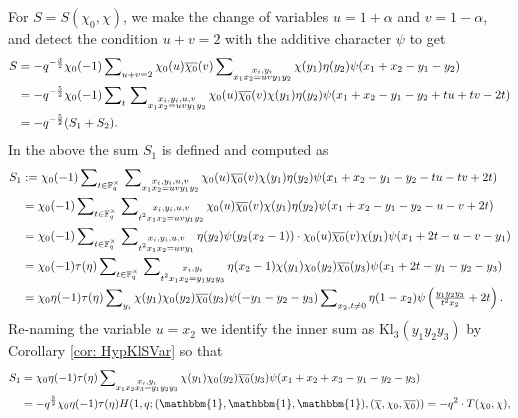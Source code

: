 \documentclass[A4]{amsart}
\numberwithin{equation}{section} \everymath{\displaystyle}
\newcommand{\id}{\mathbbm{1}}
\newcommand{\Kl}{\mathrm{Kl}}
\newcommand{\fF}{\mathbb{F}}
\begin{document}
	For $S=S(\chi_0,\chi)$, we make the change of variables $u=1+\alpha$ and $v = 1-\alpha$, and detect the condition $u+v = 2$ with the additive character $\psi$ to get
\begin{align*}
	S &= -q^{-\frac{3}{2}} \chi_0(-1)\sideset{}{_{u+v=2}} \sum \chi_0(u) \overline{\chi_0}(v) \sideset{}{_{\substack{x_i,y_i \\ x_1x_2 = uv y_1y_2}}} \sum \chi(y_1) \eta(y_2) \psi(x_1+x_2-y_1-y_2) \\
	&= -q^{-\frac{5}{2}} \chi_0(-1) \sideset{}{_t} \sum \sideset{}{_{\substack{x_i,y_i,u,v \\ x_1x_2 = uv y_1y_2}}} \sum \chi_0(u) \overline{\chi_0}(v) \chi(y_1) \eta(y_2) \psi(x_1+x_2-y_1-y_2+tu+tv-2t) \\
	&= -q^{-\frac{5}{2}}(S_1+S_2).
\end{align*}
	In the above the sum $S_1$ is defined and computed as
\begin{align*}
	S_1 &:= \chi_0(-1) \sideset{}{_{t \in \fF_q^{\times}}} \sum \sideset{}{_{\substack{x_i,y_i,u,v \\ x_1x_2 = uv y_1y_2}}} \sum \chi_0(u) \overline{\chi_0}(v) \chi(y_1) \eta(y_2) \psi(x_1+x_2-y_1-y_2-tu-tv+2t) \\
	&= \chi_0(-1) \sideset{}{_{t \in \fF_q^{\times}}} \sum \sideset{}{_{\substack{x_i,y_i,u,v \\ t^2 x_1x_2 = uv y_1y_2}}} \sum \chi_0(u) \overline{\chi_0}(v) \chi(y_1) \eta(y_2) \psi(x_1+x_2-y_1-y_2-u-v+2t) \\
	&= \chi_0(-1) \sideset{}{_{t \in \fF_q^{\times}}} \sum \sideset{}{_{\substack{x_i,y_i,u,v \\ t^2 x_1x_2 = uv y_1}}} \sum \eta(y_2) \psi(y_2(x_2-1)) \cdot \chi_0(u) \overline{\chi_0}(v) \chi(y_1) \psi(x_1+2t-u-v-y_1) \\
	&= \chi_0(-1) \tau(\eta) \sideset{}{_{t \in \fF_q^{\times}}} \sum \sideset{}{_{\substack{x_i,y_i \\ t^2 x_1x_2 = y_1y_2y_3}}} \sum \eta(x_2-1) \chi(y_1) \chi_0(y_2) \overline{\chi_0}(y_3) \psi(x_1+2t-y_1-y_2-y_3) \\
	&= \chi_0\eta(-1) \tau(\eta) \sideset{}{_{y_i}} \sum \chi(y_1) \chi_0(y_2) \overline{\chi_0}(y_3) \psi(-y_1-y_2-y_3) \sideset{}{_{x_2,t \neq 0}} \sum \eta(1-x_2) \psi \left( \tfrac{y_1y_2y_3}{t^2 x_2} + 2t \right).
\end{align*}
	Re-naming the variable $u=x_2$ we identify the inner sum as $\Kl_3(y_1y_2y_3)$ by Corollary \ref{cor: HypKlSVar} so that
\begin{align*} 
	S_1 &= \chi_0\eta(-1) \tau(\eta) \sideset{}{_{\substack{x_i,y_i \\ x_1x_2x_3=y_1y_2y_3}}} \sum \chi(y_1) \chi_0(y_2) \overline{\chi_0}(y_3) \psi(x_1+x_2+x_3-y_1-y_2-y_3) \\
	&= -q^{\frac{5}{2}} \chi_0\eta(-1) \tau(\eta) H(1,q; (\id,\id,\id), (\overline{\chi}, \chi_0, \overline{\chi_0})) = -q^2 \cdot T(\chi_0,\chi),
\end{align*}
\end{document}
